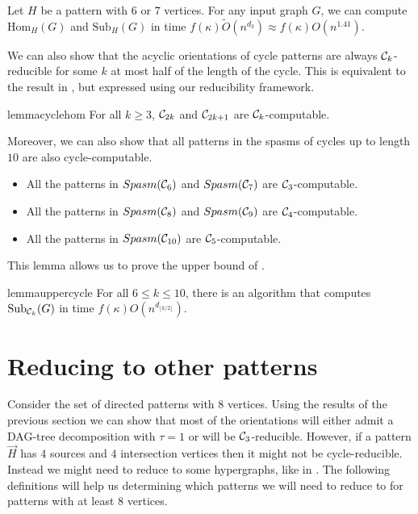 \documentclass[a4paper,UKenglish,cleveref, autoref, numberwithinsect, thm-restate]{lipics-v2021}
\newcommand{\reducible}[1]{${#1}$-reducible}
\newcommand{\computable}[1]{${#1}$-computable}
\newcommand{\cycle}[1]{\cC_{#1}}
\newcommand{\Hom}[2]{\mathrm{Hom}_{#2}(#1)}
\newcommand{\Sub}[2]{\mathrm{Sub}_{#2}(#1)}
\newcommand{\Spasm}{Spasm}
\newcommand{\degen}{\kappa}
\newcommand{\dagtree}{DAG-tree decomposition}
\newcommand{\cC}{{\cal C}}
\begin{document}
	\begin{corollary} \label{cor:sixseven}
		Let $H$ be a pattern with $6$ or $7$ vertices. For any input graph $G$, we can compute $\Hom{G}{H}$ and $\Sub{G}{H}$ in time $f(\degen)\tilde{O}(n^{d_3}) \approx f(\degen)O(n^{1.41})$.
	\end{corollary}
	
	We can also show that the acyclic orientations of cycle patterns are always \reducible{\cycle{k}} for some $k$ at most half of the length of the cycle. This is equivalent to the result in \cite{GiLeSh+23}, but expressed using our reducibility framework.
	
	\begin{restatable}{lemma}{cyclehom}  \label{lem:cycle_hom}
		For all $k\geq3$, $\cycle{2k}$ and $\cycle{2k+1}$ are \computable{\cycle{k}}.
	\end{restatable}


	Moreover, we can also show that all patterns in the spasms of cycles up to length $10$ are also cycle-computable.
	
	\begin{lemma} \label{lem:spasms}
		\begin{itemize}
			\item All the patterns in $\Spasm(\cycle{6})$ and $\Spasm(\cycle{7})$ are \computable{\cycle{3}}.
			\item All the patterns in $\Spasm(\cycle{8})$ and $\Spasm(\cycle{9})$ are \computable{\cycle{4}}.
			\item All the patterns in $\Spasm(\cycle{10})$ are \computable{\cycle{5}}.
		\end{itemize}
	\end{lemma}

	This lemma allows us to prove the upper bound of .
	\begin{restatable}{lemma}{uppercycle} \label{lem:uppercycle}
		For all $6\leq k\leq 10$, there is an algorithm that computes $\Sub{G}{\cycle{k}}$ in time $f(\degen)O(n^{d_{\lfloor k/2\rfloor}})$.
	\end{restatable}
	
	\section{Reducing to other patterns} \label{sec:others}
	
	Consider the set of directed patterns with $8$ vertices. Using the results of the previous section we can show that most of the orientations will either admit a \dagtree{} with $\tau=1$ or will be \reducible{\cycle{3}}. However, if a pattern $\vec{H}$ has $4$ sources and $4$ intersection vertices then it might not be cycle-reducible. Instead we might need to reduce to some hypergraphs, like in . The following definitions will help us determining which patterns we will need to reduce to for patterns with at least $8$ vertices.
	
\end{document}

